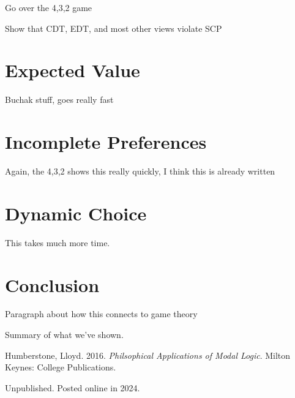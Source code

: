 \documentclass[
  10pt,
  letterpaper,
  DIV=11,
  numbers=noendperiod,
  twoside]{scrartcl}
\newlength{\cslhangindent}
\newenvironment{CSLReferences}[2] %
 {\begin{list}{}{%
  \setlength{\itemindent}{0pt}
  \setlength{\leftmargin}{0pt}
  \setlength{\parsep}{0pt}
  \ifodd #1
   \setlength{\leftmargin}{\cslhangindent}
   \setlength{\itemindent}{-1\cslhangindent}
  \fi
  \setlength{\itemsep}{#2\baselineskip}}}
 {\end{list}}
\begin{document}
Go over the 4,3,2 game

Show that CDT, EDT, and most other views violate SCP

\section{Expected Value}\label{expected-value}

Buchak stuff, goes really fast

\section{Incomplete Preferences}\label{incomplete-preferences-1}

Again, the 4,3,2 shows this really quickly, I think this is already
written

\section{Dynamic Choice}\label{dynamic-choice-1}

This takes much more time.

\section{Conclusion}\label{conclusion}

Paragraph about how this connects to game theory

Summary of what we've shown.

\label{refs}
\begin{CSLReferences}{1}{0}
Humberstone, Lloyd. 2016. \emph{Philsophical Applications of Modal
Logic}. Milton Keynes: College Publications.

\end{CSLReferences}



\noindent Unpublished. Posted online in 2024.
\end{document}
